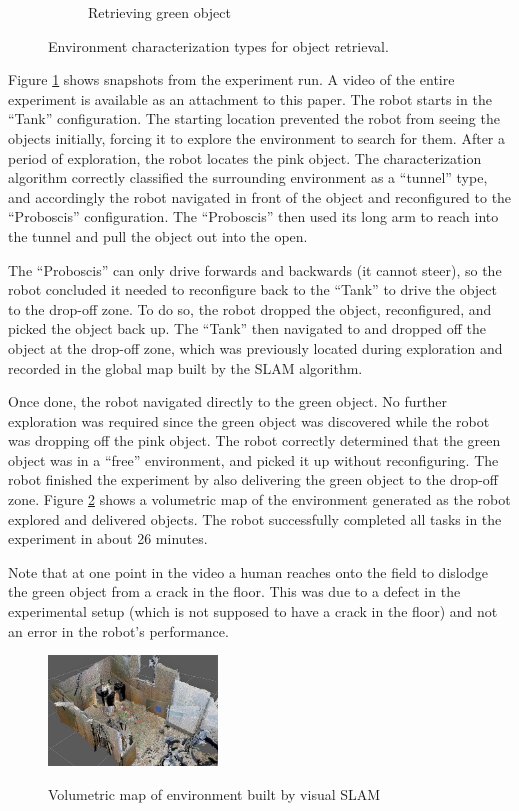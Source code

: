\documentclass[conference]{IEEEtran}
\begin{document}
\begin{figure}[t]
\begin{subfigure}[t]{0.32\textwidth}
        \caption{Retrieving green object}
    \end{subfigure}
      \caption{Environment characterization types for object retrieval.}
      \label{fig:demo}
   \vspace{-1em}
   \end{figure}
%
Figure \ref{fig:demo} shows snapshots from the experiment run. A video of the entire experiment is available as an attachment to this paper. The robot starts in the ``Tank'' configuration. The starting location prevented the robot from seeing the objects initially, forcing it to explore the environment to search for them. After a period of exploration, the robot locates the pink object. The characterization algorithm correctly classified the surrounding environment as a ``tunnel'' type, and accordingly the robot navigated in front of the object and reconfigured to the ``Proboscis'' configuration. The ``Proboscis'' then used its long arm to reach into the tunnel and pull the object out into the open.

 The ``Proboscis'' can only drive forwards and backwards (it cannot steer), so the robot concluded it needed to reconfigure back to the ``Tank'' to drive the object to the drop-off zone.  To do so, the robot dropped the object,  reconfigured, and picked the object back up. The ``Tank'' then navigated to and dropped off the object at the drop-off zone, which was previously located during exploration and recorded in the global map built by the SLAM algorithm.

 Once done, the robot navigated directly to the green object.  No further exploration was required since the green object was discovered while the robot was dropping off the pink object. The robot correctly determined
that the green object was in a ``free'' environment, and picked it up without reconfiguring. The robot finished the experiment by also delivering the green object to the drop-off zone. Figure \ref{fig:octomap} shows a volumetric map of the environment generated as the robot explored and delivered objects. The robot successfully completed all tasks in the experiment in about 26 minutes. 

Note that at one point in the video a human reaches onto the field to dislodge the green object from a crack in the floor.  This was due to a defect in the experimental setup (which is not supposed to have a crack in the floor) and not an error in the robot's performance.
%
\begin{figure}
\begin{center}
\includegraphics[width=0.4\textwidth]{images/map4.jpg}
\caption{Volumetric map of environment built by visual SLAM}
\vspace{-2em}
\label{fig:octomap}
\end{center}
\end{figure}
\end{document}
